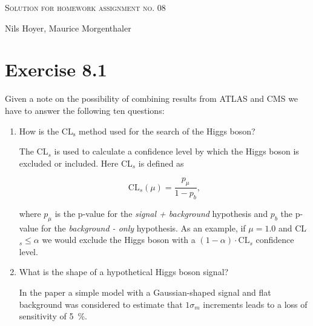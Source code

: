 \documentclass[10pt]{article}
\newenvironment{myfont}{\fontfamily{put}\selectfont}{\par}
\begin{document}
\begin{myfont}

\begin{center}
  \begin{Large}
    \textsc{Solution for homework assignment no. 08} \\
  \end{Large}
	\vspace*{0.4cm}
    Nils Hoyer, Maurice Morgenthaler
  \vspace*{1cm}
\end{center}

\section*{Exercise 8.1}

Given a note on the possibility of combining results from ATLAS and CMS we have to answer the following ten questions:

\begin{enumerate}[label = \textbf{\roman*}.]
  \item How is the CL$_{\textrm{s}}$ method used for the search of the Higgs boson?

  \noindent The CL$_{s}$ is used to calculate a confidence level by which the Higgs boson is excluded or included.
  Here CL$_{s}$ is defined as

  \begin{equation}
  	\textrm{CL}_{s}(\mu) = \frac{p_{\mu}}{1 - p_{b}},	
  \end{equation}

  \noindent where $p_{\mu}$ is the p-value for the \textit{signal + background} hypothesis and $p_{b}$ the p-value for the \textit{background - only} hypothesis.
  As an example, if $\mu = 1.0$ and CL$_{s} \leq \alpha$ we would exclude the Higgs boson with a $(1 - \alpha) \cdot \textrm{CL}_{s}$ confidence level.

  \item What is the shape of a hypothetical Higgs boson signal?

  \noindent In the paper a simple model with a Gaussian-shaped signal and flat background was considered to estimate that $1\sigma_{m}$ increments leads to a loss of sensitivity of \SI{5}{\percent}. %


\end{enumerate}
\end{myfont}
\end{document}
